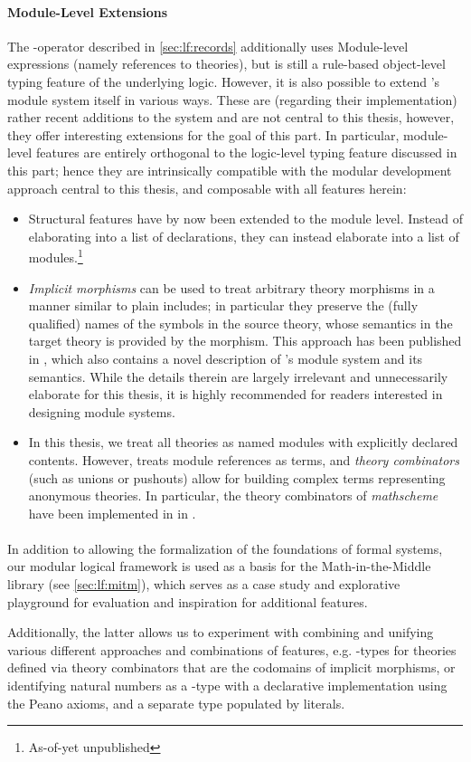 \paragraph{Module-Level Extensions} The -operator described in \autoref{sec:lf:records} additionally uses Module-level expressions (namely references to theories), but is still a rule-based object-level typing feature of the underlying logic. However, it is also possible to extend \mmt's module system itself in various ways. These are (regarding their implementation) rather recent additions to the \mmt system and are not central to this thesis, however, they offer interesting extensions for the goal of this part. In particular, module-level features are entirely orthogonal to the logic-level typing feature discussed in this part; hence they are intrinsically compatible with the modular development approach central to this thesis, and composable with all features herein:

\begin{itemize}
	\item Structural features have by now been extended to the module level. Instead of elaborating into a list of declarations, they can instead elaborate into a list of modules.\footnote{As-of-yet unpublished}
	\item \emph{Implicit morphisms} can be used to treat arbitrary theory morphisms in a manner similar to plain includes; in particular they preserve the (fully qualified) names of the symbols in the source theory, whose semantics in the target theory is provided by the morphism. This approach has been published in \cite{RabMue:WADT18}, which also contains a novel description of \mmt's module system and its semantics. While the details therein are largely irrelevant and unnecessarily elaborate for this thesis, it is highly recommended for readers interested in designing module systems.
	\item In this thesis, we treat all theories as named modules with explicitly declared contents. However, \mmt treats module references as \mmt terms, and \emph{theory combinators} (such as unions or pushouts) allow for building complex terms representing anonymous theories. In particular, the theory combinators of \emph{mathscheme}~\cite{mathscheme} have been implemented in \mmt in .
\end{itemize}

\paragraph{} In addition to allowing the formalization of the foundations of formal systems, our modular logical framework is used as a basis for the Math-in-the-Middle library (see \autoref{sec:lf:mitm}), which serves as a case study and explorative playground for evaluation and inspiration for additional features. 

Additionally, the latter allows us to experiment with combining and unifying various different approaches and combinations of features, e.g. -types for theories defined via theory combinators that are the codomains of implicit morphisms, or identifying natural numbers as a \wtypesym-type with a declarative implementation using the Peano axioms, and a separate type populated by literals.